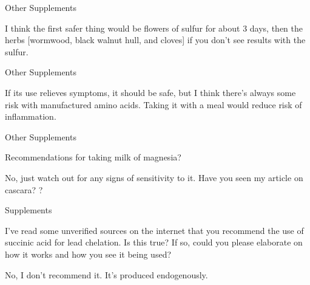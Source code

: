 \documentclass[11pt,oneside,openany,extrafontsizes]{memoir}
\begin{document}
\begin{standalonequote}{Other Supplements}

    \begin{answer}
        I think the first safer thing would be flowers of sulfur for about 3 days, then the herbs [wormwood, black walnut hull, and cloves] if you don't see results with the sulfur.
    \end{answer}
\end{standalonequote}

\begin{standalonequote}{Other Supplements}

    \begin{answer}
        If its use relieves symptoms, it should be safe, but I think there's always some risk with manufactured amino acids. Taking it with a meal would reduce risk of inflammation.
    \end{answer}
\end{standalonequote}

\begin{qaexchange}{Other Supplements}

    \begin{question}
        Recommendations for taking milk of magnesia?
    \end{question}

    \begin{answer}
        No, just watch out for any signs of sensitivity to it. Have you seen my article on cascara? ?
    \end{answer}
\end{qaexchange}

\begin{qaexchange}{Supplements}

    \begin{question}
        I've read some unverified sources on the internet that you recommend the use of succinic acid for lead chelation. Is this true? If so, could you please elaborate on how it works and how you see it being used?
    \end{question}

    \begin{answer}
        No, I don't recommend it. It's produced endogenously.
    \end{answer}
\end{qaexchange}
\end{document}

